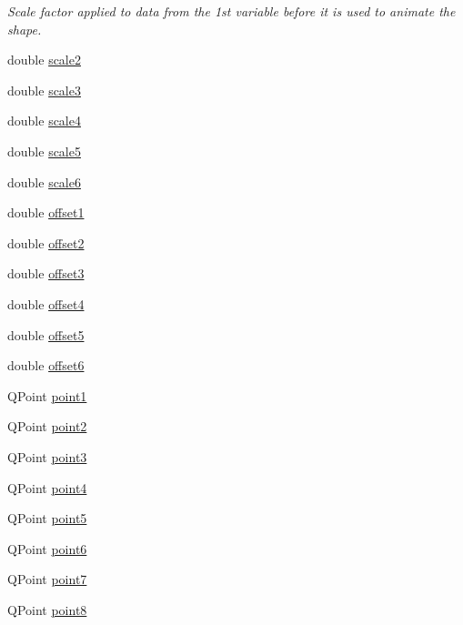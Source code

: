 \begin{DoxyCompactItemize}
\begin{DoxyCompactList}\small\item\em Scale factor applied to data from the 1st variable before it is used to animate the shape. \end{DoxyCompactList}\item 
double \hyperlink{classQEShape_af607170e722e09eabb07b4aff0925d6e}{scale2}
\item 
double \hyperlink{classQEShape_abb13edc7d6921d3053f3eaa548d2b0c4}{scale3}
\item 
double \hyperlink{classQEShape_a0feed87d7fa5693b7d2811aec5c292bd}{scale4}
\item 
double \hyperlink{classQEShape_a5ad50163b31a75075c9a09a056a51d98}{scale5}
\item 
double \hyperlink{classQEShape_a381195400bee141aea3ec023a686351b}{scale6}
\item 
double \hyperlink{classQEShape_a93f9f86f53629c22a050cf40b2119e48}{offset1}
\item 
double \hyperlink{classQEShape_a84870198dda8f607681f49983c7581a0}{offset2}
\item 
double \hyperlink{classQEShape_a7c1810b1167f108265fc8191c8d2a6eb}{offset3}
\item 
double \hyperlink{classQEShape_ae44e71e3555a29795e8ade5997b8b263}{offset4}
\item 
double \hyperlink{classQEShape_a11a45d44e7488a4ae9cdd7911ef0c2a8}{offset5}
\item 
double \hyperlink{classQEShape_ad79ddaf949b7680c4c426a44a94d7768}{offset6}
\item 
QPoint \hyperlink{classQEShape_a23eef41ef82be0c55ee604e0abca991b}{point1}
\item 
QPoint \hyperlink{classQEShape_a90d874fd63000ddac67e54d931b2de71}{point2}
\item 
QPoint \hyperlink{classQEShape_ab37cdcf0b135616c54aa2988c39f998a}{point3}
\item 
QPoint \hyperlink{classQEShape_aaaee931eb20aeb2198c3333c7f270292}{point4}
\item 
QPoint \hyperlink{classQEShape_aa7eaf5fd15ec4d2e799a7f39bf4e9cef}{point5}
\item 
QPoint \hyperlink{classQEShape_ab90ca6da2a435753d713b288f315c9d8}{point6}
\item 
QPoint \hyperlink{classQEShape_ae6aa684a03e03e4bbf86727d05a7e258}{point7}
\item 
QPoint \hyperlink{classQEShape_a04c9ab4f601d7edcfdb32937502227c1}{point8}
\item 

\end{DoxyCompactItemize}
